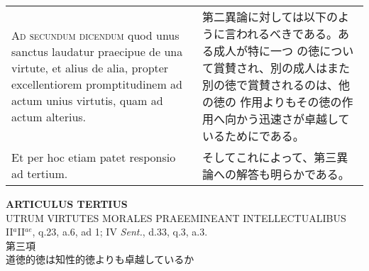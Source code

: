 \documentclass[10pt]{jsarticle}
\begin{document}
\begin{longtable}{p{21em}p{21em}}
{\scshape Ad secundum dicendum} quod unus sanctus laudatur praecipue
de una virtute, et alius de alia, propter excellentiorem
promptitudinem ad actum unius virtutis, quam ad actum alterius.

&

 第二異論に対しては以下のように言われるべきである。ある成人が特に一つ
 の徳について賞賛され、別の成人はまた別の徳で賞賛されるのは、他の徳の
 作用よりもその徳の作用へ向かう迅速さが卓越しているためにである。

\\


Et per hoc etiam patet responsio ad tertium.


&

そしてこれによって、第三異論への解答も明らかである。


\end{longtable}
\newpage





\begin{center}
{\Large {\bf ARTICULUS TERTIUS}}\\
{\large UTRUM VIRTUTES MORALES PRAEEMINEANT INTELLECTUALIBUS}\\
 {\footnotesize II$^{a}$II$^{ae}$, q.23, a.6, ad 1; IV {\itshape Sent.}, d.33, q.3, a.3.}\\
{\Large 第三項\\道徳的徳は知性的徳よりも卓越しているか}
\end{center}
\end{document}
